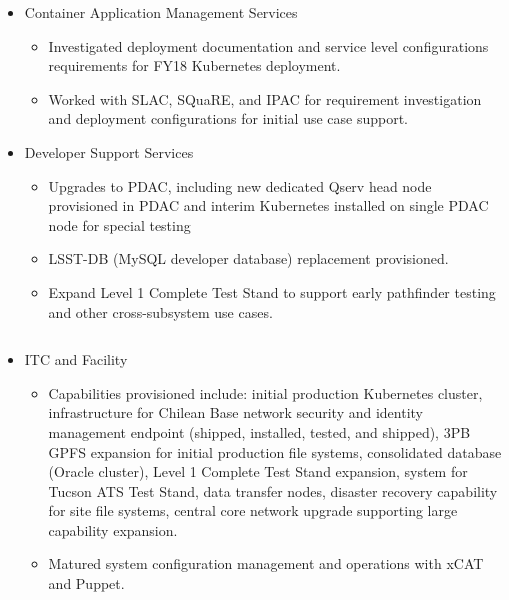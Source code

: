 {\begin{itemize}
\begin{itemize}
\end{itemize}
\item Container Application Management Services

\begin{itemize}
    \item Investigated deployment documentation and service level configurations requirements for FY18 Kubernetes deployment.
    \item Worked with SLAC, SQuaRE, and IPAC for requirement investigation and deployment configurations for initial use case support.

\end{itemize}
\item Developer Support Services

\begin{itemize}
    \item Upgrades to PDAC, including new dedicated Qserv head node provisioned in PDAC and interim Kubernetes installed on single PDAC node for special testing
    \item LSST-DB (MySQL developer database) replacement provisioned.
    \item Expand Level 1 Complete Test Stand to support early pathfinder testing and other cross-subsystem use cases.

	\end{itemize}
\end{itemize}

\begin{columns}
\begin{column}{0.6\textwidth}
\vspace{-4.5cm}
\begin{itemize}
\item ITC and Facility

	\begin{itemize}
    \item Capabilities provisioned include: initial production Kubernetes cluster, infrastructure for Chilean Base network security and identity management endpoint (shipped, installed, tested, and shipped), 3PB GPFS expansion for initial production file systems, consolidated database (Oracle cluster), Level 1 Complete Test Stand expansion, system for Tucson ATS Test Stand, data transfer nodes, disaster recovery capability for site file systems, central core network upgrade supporting large capability expansion.
    \item Matured system configuration management and operations with xCAT and Puppet.


\end{itemize}
\end{itemize}
\end{column}
\end{columns}}
